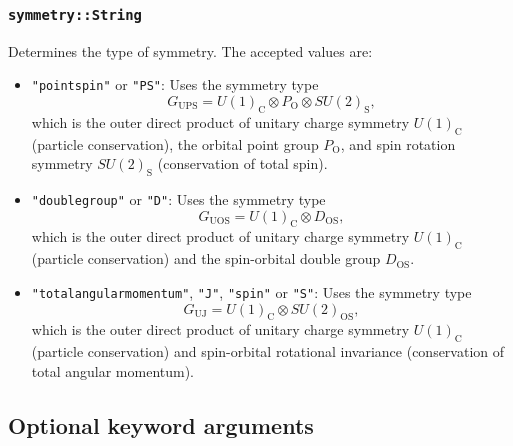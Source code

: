 \documentclass[notitlepage]{article}
\begin{document}
\subsubsection{\texttt{symmetry::String}}
\label{multiplets_symmetry}
Determines the type of symmetry. The accepted values are:
\begin{itemize}
    \item \texttt{"pointspin"} or \texttt{"PS"}: Uses
        the symmetry type
        \begin{equation}
            G_\text{UPS} = 
            U(1)_\text{C} \otimes
            P_\text{O} \otimes
            SU(2)_\text{S},
        \end{equation}
        which is the outer direct product of unitary charge
        symmetry $U(1)_\text{C}$ (particle conservation),
        the orbital point group $P_\text{O}$, and spin
        rotation symmetry $SU(2)_\text{S}$ (conservation of
        total spin).
    \item \texttt{"doublegroup"} or \texttt{"D"}: Uses 
        the symmetry type
        \begin{equation}
            G_\text{UOS} =
            U(1)_\text{C} \otimes
            D_\text{OS},
        \end{equation}
        which is the outer direct product of unitary charge
        symmetry $U(1)_\text{C}$ (particle conservation) and
        the spin-orbital double group $D_\text{OS}$.
    \item \texttt{"totalangularmomentum"}, \texttt{"J"},
        \texttt{"spin"} or \texttt{"S"}:
        Uses the symmetry type
        \begin{equation}
            G_\text{UJ} =
            U(1)_\text{C} \otimes
            SU(2)_\text{OS},
        \end{equation}
        which is the outer direct product of unitary charge
        symmetry $U(1)_\text{C}$ (particle conservation) and
        spin-orbital rotational invariance (conservation of
        total angular momentum).
\end{itemize}

\subsection{Optional keyword arguments}
\end{document}
